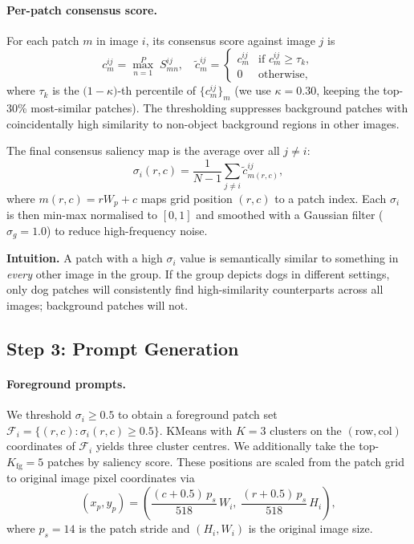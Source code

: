 \documentclass[10pt,twocolumn,letterpaper]{article}
\begin{document}
\paragraph{Per-patch consensus score.}
For each patch $m$ in image $i$, its consensus score against image $j$ is
\begin{equation}
  c^{ij}_m = \max_{n=1}^{P}\; S^{ij}_{mn},
  \quad
  \tilde{c}^{ij}_m =
    \begin{cases} c^{ij}_m & \text{if } c^{ij}_m \geq \tau_k, \\ 0 & \text{otherwise,} \end{cases}
\end{equation}
where $\tau_k$ is the $\bigl(1-\kappa\bigr)$-th percentile of $\{c^{ij}_m\}_m$
(we use $\kappa = 0.30$, keeping the top-30\% most-similar patches).
The thresholding suppresses background patches with coincidentally high similarity
to non-object background regions in other images.

The final consensus saliency map is the average over all $j \neq i$:
\begin{equation}
  \label{eq:saliency}
  \sigma_i(r,c) = \frac{1}{N-1} \sum_{j \neq i} \tilde{c}^{ij}_{m(r,c)},
\end{equation}
where $m(r,c) = r W_p + c$ maps grid position $(r,c)$ to a patch index.
Each $\sigma_i$ is then min-max normalised to $[0,1]$ and smoothed with a
Gaussian filter ($\sigma_g = 1.0$) to reduce high-frequency noise.

\textbf{Intuition.}
A patch with a high $\sigma_i$ value is semantically similar to something in
\emph{every} other image in the group.
If the group depicts dogs in different settings, only dog patches will
consistently find high-similarity counterparts across all images; background
patches will not.

\subsection{Step 3: Prompt Generation}

\paragraph{Foreground prompts.}
We threshold $\sigma_i \geq 0.5$ to obtain a foreground patch set
$\mathcal{F}_i = \{(r,c) : \sigma_i(r,c) \geq 0.5\}$.
KMeans with $K=3$ clusters on the $(\text{row}, \text{col})$ coordinates of
$\mathcal{F}_i$ yields three cluster centres.
We additionally take the top-$K_{\text{fg}}=5$ patches by saliency score.
These positions are scaled from the patch grid to original image pixel coordinates
via
\begin{equation}
  (x_p, y_p) = \left(
    \frac{(c + 0.5)\, p_s}{518}\, W_i,\;
    \frac{(r + 0.5)\, p_s}{518}\, H_i
  \right),
\end{equation}
where $p_s = 14$ is the patch stride and $(H_i, W_i)$ is the original image size.
\end{document}

